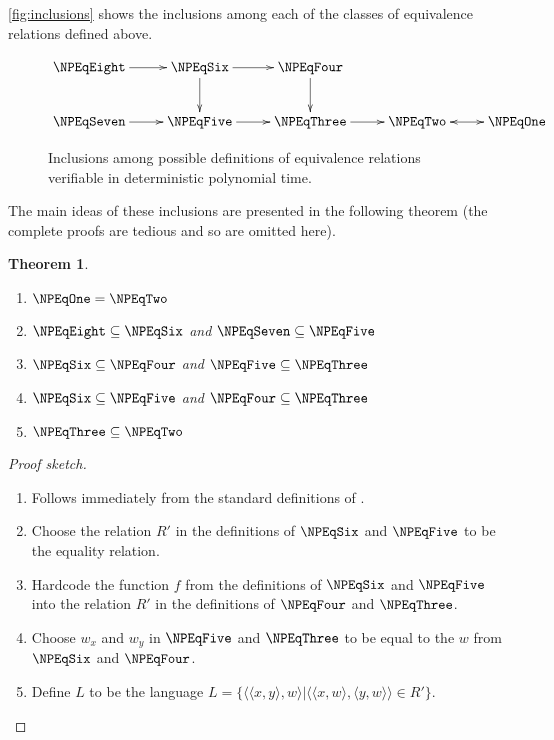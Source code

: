 \documentclass[draft]{article}
\newtheorem{theorem}{Theorem}[section]
\theoremstyle{definition} \newtheorem{openproblem}[openproblem]{Open problem}
\theoremstyle{definition} \newtheorem{definition}[definition]{Definition}
\newenvironment{sketch}{\begin{proof}[Proof sketch]}{\end{proof}}
\newcommand{\pair}[2]{\langle#1,#2\rangle} %
\begin{document}
\autoref{fig:inclusions} shows the inclusions among each of the classes of equivalence relations defined above.
\begin{figure}
  \caption{\label{fig:inclusions}Inclusions among possible definitions of equivalence relations verifiable in deterministic polynomial time.}
  \begin{displaymath}
    \xymatrix{%
      \NPEqEight \ar[r] & \NPEqSix \ar[d] \ar[r] & \NPEqFour \ar[d] \\
      \NPEqSeven \ar[r] & \NPEqFive \ar[r] & \NPEqThree \ar[r] & \NPEqTwo \ar@{<->}[r] & \NPEqOne }
  \end{displaymath}
\end{figure}
The main ideas of these inclusions are presented in the following theorem (the complete proofs are tedious and so are omitted here).
\begin{theorem}\mbox{}
  \begin{enumerate}
  \item $\NPEqOne=\NPEqTwo$
  \item $\NPEqEight\subseteq\NPEqSix$ and $\NPEqSeven\subseteq\NPEqFive$
  \item $\NPEqSix\subseteq\NPEqFour$ and $\NPEqFive\subseteq\NPEqThree$
  \item $\NPEqSix\subseteq\NPEqFive$ and $\NPEqFour\subseteq\NPEqThree$
  \item $\NPEqThree\subseteq\NPEqTwo$
  \end{enumerate}
\end{theorem}
\begin{sketch}\mbox{}
  \begin{enumerate}
  \item Follows immediately from the standard definitions of \NP.
  \item Choose the relation $R'$ in the definitions of $\NPEqSix$ and $\NPEqFive$ to be the equality relation.
  \item Hardcode the function $f$ from the definitions of $\NPEqSix$ and $\NPEqFive$ into the relation $R'$ in the definitions of $\NPEqFour$ and $\NPEqThree$.
  \item Choose $w_x$ and $w_y$ in $\NPEqFive$ and $\NPEqThree$ to be equal to the $w$ from $\NPEqSix$ and $\NPEqFour$.
  \item Define $L$ to be the language $L=\{\pair{\pair{x}{y}}{w}|\pair{\pair{x}{w}}{\pair{y}{w}}\in R'\}$.\qedhere
  \end{enumerate}
\end{sketch}
\end{document}
